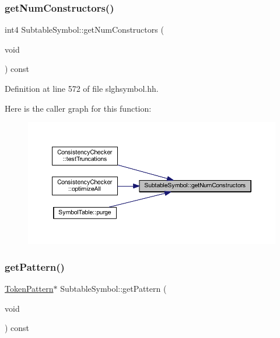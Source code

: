 \subsubsection{\texorpdfstring{getNumConstructors()}{getNumConstructors()}}
{\footnotesize\ttfamily int4 Subtable\+Symbol\+::get\+Num\+Constructors (\begin{DoxyParamCaption}\item[{void}]{ }\end{DoxyParamCaption}) const\hspace{0.3cm}{\ttfamily [inline]}}



Definition at line 572 of file slghsymbol.\+hh.

Here is the caller graph for this function\+:
\nopagebreak
\begin{figure}[H]
\begin{center}
\leavevmode
\includegraphics[width=350pt]{class_subtable_symbol_a0890d79234a82b73714a3a5657e9730f_icgraph}
\end{center}
\end{figure}
\mbox{\label{class_subtable_symbol_a131d57e0a974bd170fa21fe64c3bc4b0}} 
\subsubsection{\texorpdfstring{getPattern()}{getPattern()}}
{\footnotesize\ttfamily \mbox{\hyperlink{class_token_pattern}{Token\+Pattern}}$\ast$ Subtable\+Symbol\+::get\+Pattern (\begin{DoxyParamCaption}\item[{void}]{ }\end{DoxyParamCaption}) const\hspace{0.3cm}{\ttfamily [inline]}}



